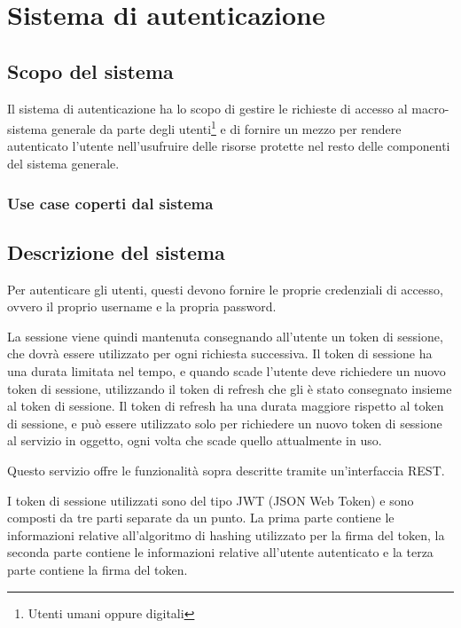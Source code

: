 \chapter{Sistema di autenticazione}


\section{Scopo del sistema}

Il sistema di autenticazione ha lo scopo di gestire le richieste di accesso al macro-sistema generale da parte degli utenti\footnote{Utenti umani oppure digitali} e di fornire un mezzo per rendere autenticato l'utente nell'usufruire delle risorse protette nel resto delle componenti del sistema generale.

\subsection{Use case coperti dal sistema}




\section{Descrizione del sistema}

Per autenticare gli utenti, questi devono fornire le proprie credenziali di accesso, ovvero il proprio username e la propria password.

La sessione viene quindi mantenuta consegnando all'utente un token di sessione, che dovrà essere utilizzato per ogni richiesta successiva. Il token di sessione ha una durata limitata nel tempo, e quando scade l'utente deve richiedere un nuovo token di sessione, utilizzando il token di refresh che gli è stato consegnato insieme al token di sessione. Il token di refresh ha una durata maggiore rispetto al token di sessione, e può essere utilizzato solo per richiedere un nuovo token di sessione al servizio in oggetto, ogni volta che scade quello attualmente in uso.

Questo servizio offre le funzionalità sopra descritte tramite un'interfaccia REST.

I token di sessione utilizzati sono del tipo JWT (JSON Web Token) e sono composti da tre parti separate da un punto. La prima parte contiene le informazioni relative all'algoritmo di hashing utilizzato per la firma del token, la seconda parte contiene le informazioni relative all'utente autenticato e la terza parte contiene la firma del token.

